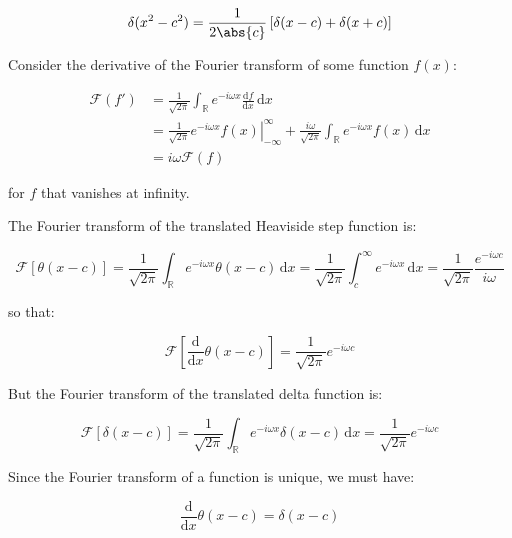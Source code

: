 \documentclass[12pt]{article}
\begin{document}
\begin{equation}
    \delta(x^{2} - c^{2}) = \frac{1}{2\abs{c}} \left[ \delta(x - c) + \delta(x + c) \right]
\end{equation}

Consider the derivative of the Fourier transform of some function $f(x)$:

\begin{equation}
    \begin{split}
        \mathcal{F}(f') &= \frac{1}{\sqrt{2\pi}} \int_{\mathbb{R}} e^{-i\omega x} \frac{\mathrm{d}f}{\mathrm{d}x} \, \mathrm{d}x \\
        &= \frac{1}{\sqrt{2\pi}} \left. e^{-i\omega x} f(x) \right|_{-\infty}^{\infty} + \frac{i\omega}{\sqrt{2\pi}} \int_{\mathbb{R}} e^{-i\omega x} f(x) \, \mathrm{d}x \\
        &= i\omega \mathcal{F}(f)
    \end{split}
\end{equation}

for $f$ that vanishes at infinity.

The Fourier transform of the translated Heaviside step function is:

\begin{equation}
    \mathcal{F}[\theta(x - c)] = \frac{1}{\sqrt{2\pi}} \int_{\mathbb{R}} e^{-i\omega x} \theta(x - c) \, \mathrm{d}x = \frac{1}{\sqrt{2\pi}} \int_{c}^{\infty} e^{-i\omega x} \, \mathrm{d}x = \frac{1}{\sqrt{2\pi}} \frac{e^{-i\omega c}}{i\omega}
\end{equation}

so that:

\begin{equation}
    \mathcal{F}\left[ \frac{\mathrm{d}}{\mathrm{d}x} \theta(x - c) \right] = \frac{1}{\sqrt{2\pi}} e^{-i\omega c}
\end{equation}

But the Fourier transform of the translated delta function is:

\begin{equation}
    \mathcal{F}[\delta(x - c)] = \frac{1}{\sqrt{2\pi}} \int_{\mathbb{R}} e^{-i\omega x} \delta(x - c) \, \mathrm{d}x = \frac{1}{\sqrt{2\pi}} e^{-i\omega c}
\end{equation}

Since the Fourier transform of a function is unique, we must have:

\begin{equation}
    \frac{\mathrm{d}}{\mathrm{d}x} \theta(x - c) = \delta(x - c)
\end{equation}
\end{document}
